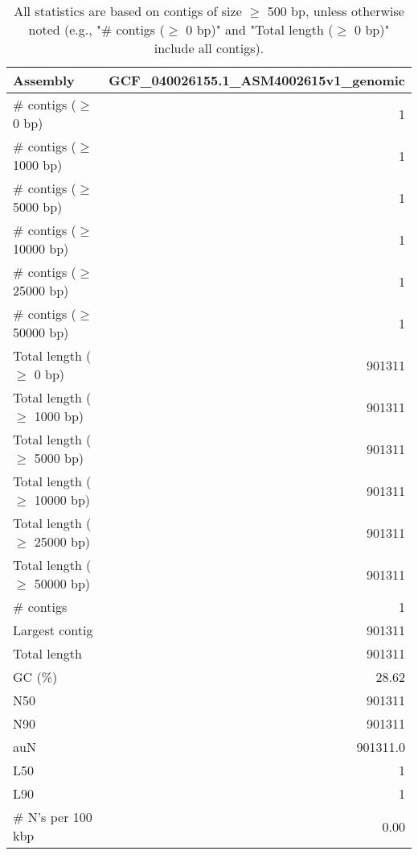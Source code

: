 \documentclass[12pt,a4paper]{article}
\begin{document}
\begin{table}[ht]
\begin{center}
\caption{All statistics are based on contigs of size $\geq$ 500 bp, unless otherwise noted (e.g., "\# contigs ($\geq$ 0 bp)" and "Total length ($\geq$ 0 bp)" include all contigs).}
\begin{tabular}{|l*{1}{|r}|}
\hline
Assembly & GCF\_040026155.1\_ASM4002615v1\_genomic \\ \hline
\# contigs ($\geq$ 0 bp) & 1 \\ \hline
\# contigs ($\geq$ 1000 bp) & 1 \\ \hline
\# contigs ($\geq$ 5000 bp) & 1 \\ \hline
\# contigs ($\geq$ 10000 bp) & 1 \\ \hline
\# contigs ($\geq$ 25000 bp) & 1 \\ \hline
\# contigs ($\geq$ 50000 bp) & 1 \\ \hline
Total length ($\geq$ 0 bp) & 901311 \\ \hline
Total length ($\geq$ 1000 bp) & 901311 \\ \hline
Total length ($\geq$ 5000 bp) & 901311 \\ \hline
Total length ($\geq$ 10000 bp) & 901311 \\ \hline
Total length ($\geq$ 25000 bp) & 901311 \\ \hline
Total length ($\geq$ 50000 bp) & 901311 \\ \hline
\# contigs & 1 \\ \hline
Largest contig & 901311 \\ \hline
Total length & 901311 \\ \hline
GC (\%) & 28.62 \\ \hline
N50 & 901311 \\ \hline
N90 & 901311 \\ \hline
auN & 901311.0 \\ \hline
L50 & 1 \\ \hline
L90 & 1 \\ \hline
\# N's per 100 kbp & 0.00 \\ \hline
\end{tabular}
\end{center}
\end{table}
\end{document}
